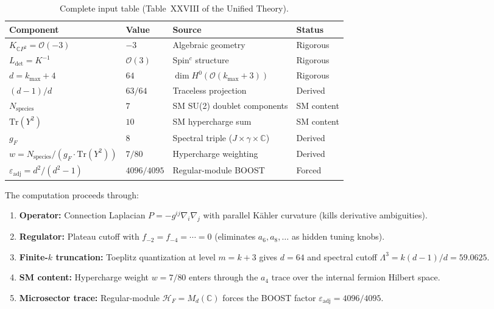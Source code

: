 \documentclass[12pt,a4paper]{article}
\theoremstyle{definition}
\begin{document}
\begin{table}[h]
\centering
\caption{Complete input table (Table~XXVIII of the Unified Theory).}
\label{tab:inputs}
\renewcommand{\arraystretch}{1.3}
\begin{tabular}{llll}
\toprule
\textbf{Component} & \textbf{Value} & \textbf{Source} & \textbf{Status} \\
\midrule
$K_{\mathbb{C}P^2} = \mathcal{O}(-3)$ & $-3$
  & Algebraic geometry & Rigorous \\
$L_{\det} = K^{-1}$ & $\mathcal{O}(3)$
  & Spin$^c$ structure & Rigorous \\
$d = k_{\max} + 4$ & $64$
  & $\dim H^0(\mathcal{O}(k_{\max}+3))$ & Rigorous \\
$(d-1)/d$ & $63/64$
  & Traceless projection & Derived \\
$N_{\mathrm{species}}$ & $7$
  & SM SU(2) doublet components & SM content \\
$\mathrm{Tr}(Y^2)$ & $10$
  & SM hypercharge sum & SM content \\
$g_F$ & $8$
  & Spectral triple ($J \times \gamma \times \mathbb{C}$) & Derived \\
$w = N_{\mathrm{species}}/(g_F \cdot \mathrm{Tr}(Y^2))$ & $7/80$
  & Hypercharge weighting & Derived \\
$\varepsilon_{\mathrm{adj}} = d^2/(d^2-1)$ & $4096/4095$
  & Regular-module BOOST & Forced \\
\bottomrule
\end{tabular}
\end{table}

The computation proceeds through:
\begin{enumerate}
\item \textbf{Operator:} Connection Laplacian $P = -g^{ij}\nabla_i\nabla_j$
  with parallel K\"ahler curvature (kills derivative ambiguities).
\item \textbf{Regulator:} Plateau cutoff with $f_{-2} = f_{-4} = \cdots = 0$
  (eliminates $a_6, a_8, \ldots$ as hidden tuning knobs).
\item \textbf{Finite-$k$ truncation:} Toeplitz quantization at level $m = k+3$
  gives $d = 64$ and spectral cutoff $\Lambda^3 = k(d{-}1)/d = 59.0625$.
\item \textbf{SM content:} Hypercharge weight $w = 7/80$ enters through the
  $a_4$ trace over the internal fermion Hilbert space.
\item \textbf{Microsector trace:} Regular-module $\mathcal{H}_F = M_d(\mathbb{C})$
  forces the BOOST factor $\varepsilon_{\mathrm{adj}} = 4096/4095$.
\end{enumerate}
\end{document}

